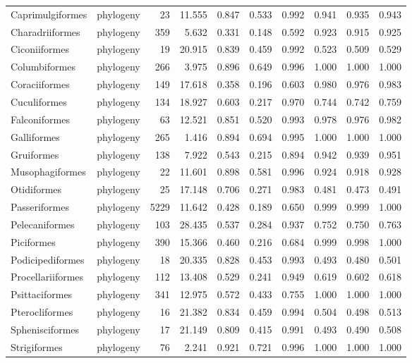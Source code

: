 \begin{longtable}{llrrrrrrrr}
  Caprimulgiformes & phylogeny &   23 & 11.555 & 0.847 & 0.533 & 0.992 & 0.941 & 0.935 & 0.943 \\ 
  Charadriiformes & phylogeny &  359 & 5.632 & 0.331 & 0.148 & 0.592 & 0.923 & 0.915 & 0.925 \\ 
  Ciconiiformes & phylogeny &   19 & 20.915 & 0.839 & 0.459 & 0.992 & 0.523 & 0.509 & 0.529 \\ 
  Columbiformes & phylogeny &  266 & 3.975 & 0.896 & 0.649 & 0.996 & 1.000 & 1.000 & 1.000 \\ 
  Coraciiformes & phylogeny &  149 & 17.618 & 0.358 & 0.196 & 0.603 & 0.980 & 0.976 & 0.983 \\ 
  Cuculiformes & phylogeny &  134 & 18.927 & 0.603 & 0.217 & 0.970 & 0.744 & 0.742 & 0.759 \\ 
  Falconiformes & phylogeny &   63 & 12.521 & 0.851 & 0.520 & 0.993 & 0.978 & 0.976 & 0.982 \\ 
  Galliformes & phylogeny &  265 & 1.416 & 0.894 & 0.694 & 0.995 & 1.000 & 1.000 & 1.000 \\ 
  Gruiformes & phylogeny &  138 & 7.922 & 0.543 & 0.215 & 0.894 & 0.942 & 0.939 & 0.951 \\ 
  Musophagiformes & phylogeny &   22 & 11.601 & 0.898 & 0.581 & 0.996 & 0.924 & 0.918 & 0.928 \\ 
  Otidiformes & phylogeny &   25 & 17.148 & 0.706 & 0.271 & 0.983 & 0.481 & 0.473 & 0.491 \\ 
  Passeriformes & phylogeny & 5229 & 11.642 & 0.428 & 0.189 & 0.650 & 0.999 & 0.999 & 1.000 \\ 
  Pelecaniformes & phylogeny &  103 & 28.435 & 0.537 & 0.284 & 0.937 & 0.752 & 0.750 & 0.763 \\ 
  Piciformes & phylogeny &  390 & 15.366 & 0.460 & 0.216 & 0.684 & 0.999 & 0.998 & 1.000 \\ 
  Podicipediformes & phylogeny &   18 & 20.335 & 0.828 & 0.453 & 0.993 & 0.493 & 0.480 & 0.501 \\ 
  Procellariiformes & phylogeny &  112 & 13.408 & 0.529 & 0.241 & 0.949 & 0.619 & 0.602 & 0.618 \\ 
  Psittaciformes & phylogeny &  341 & 12.975 & 0.572 & 0.433 & 0.755 & 1.000 & 1.000 & 1.000 \\ 
  Pterocliformes & phylogeny &   16 & 21.382 & 0.834 & 0.459 & 0.994 & 0.504 & 0.498 & 0.513 \\ 
  Sphenisciformes & phylogeny &   17 & 21.149 & 0.809 & 0.415 & 0.991 & 0.493 & 0.490 & 0.508 \\ 
  Strigiformes & phylogeny &   76 & 2.241 & 0.921 & 0.721 & 0.996 & 1.000 & 1.000 & 1.000 \\ 

\end{longtable}

